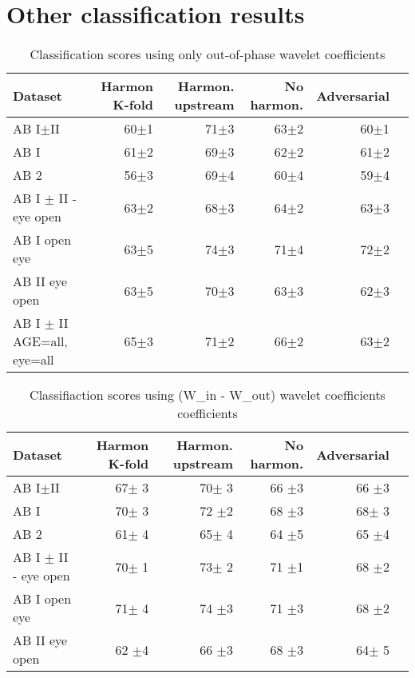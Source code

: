 \documentclass[11pt]{report}
\begin{document}
\appendix


\chapter{Other classification results}

\begin{table}[!htp]\centering
\scriptsize
\begin{tabular}{lrrrrr}\toprule
Dataset &Harmon K-fold &Harmon. upstream &No harmon. &Adversarial \\\midrule
AB I$\pm$II &60$\pm$1 &71$\pm$3 &63$\pm$2 &60$\pm$1 \\
AB I &61$\pm$2 &69$\pm$3 &62$\pm$2 &61$\pm$2 \\
AB 2 &56$\pm$3 &69$\pm$4 &60$\pm$4 &59$\pm$4 \\
AB I $\pm$ II - eye open &63$\pm$2 &68$\pm$3 &64$\pm$2 &63$\pm$3 \\
AB I open eye &63$\pm$5 &74$\pm$3 &71$\pm$4 &72$\pm$2 \\
AB II eye open &63$\pm$5 &70$\pm$3 &63$\pm$3 &62$\pm$3 \\
AB I $\pm$ II AGE=all, eye=all &65$\pm$3 &71$\pm$2 &66$\pm$2 &63$\pm$2 \\
\bottomrule
\end{tabular}
\caption{Classification scores using only out-of-phase wavelet coefficients}
\label{tab:classification_wout}
\end{table}


\begin{table}[!htp]\centering
\scriptsize
\begin{tabular}{lrrrrr}\toprule
Dataset &Harmon K-fold &Harmon. upstream &No harmon. &Adversarial \\\midrule
AB I$\pm$II &67$\pm$ 3 &70$\pm$ 3 &66 $\pm$3 &66 $\pm$3 \\
AB I &70$\pm$ 3 &72 $\pm$2 &68 $\pm$3 &68$\pm$ 3 \\
AB 2 &61$\pm$ 4 &65$\pm$ 4 &64 $\pm$5 &65 $\pm$4 \\
AB I $\pm$ II - eye open &70$\pm$ 1 &73$\pm$ 2 &71 $\pm$1 &68 $\pm$2 \\
AB I open eye &71$\pm$ 4 &74 $\pm$3 &71 $\pm$3 &68 $\pm$2 \\
AB II eye open &62 $\pm$4 &66 $\pm$3 &68 $\pm$3 &64$\pm$ 5 \\
\bottomrule
\end{tabular}
\caption{Classifiaction scores using (W\_in - W\_out) wavelet coefficients coefficients}
\label{tab:classification_win-wout}
\end{table}
\end{document}
